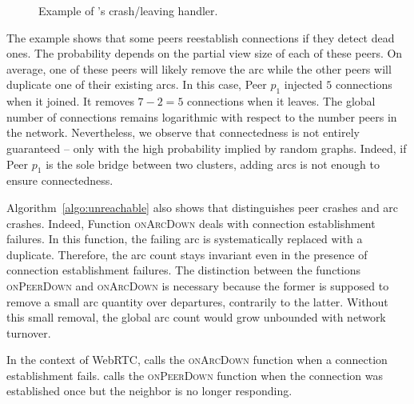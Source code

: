 \begin{figure*}
  \centering
  \hspace{10pt}
  \hspace{10pt}
  \caption{\label{fig:crashexample}Example of \SPRAY's crash/leaving
    handler. }
\end{figure*}

The example shows that some peers reestablish connections if they
detect dead ones. The probability depends on the partial view size of
each of these peers. On average, one of these peers will likely remove
the arc while the other peers will duplicate one of their existing
arcs. In this case, Peer $p_1$ injected $5$ connections when it
joined. It removes $7-2 =5 $ connections when it leaves. The global
number of connections remains logarithmic with respect to the number
peers in the network. Nevertheless, we observe that connectedness is
not entirely guaranteed -- only with the high probability implied by
random graphs. Indeed, if Peer $p_1$ is the sole bridge between two
clusters, adding arcs is not enough to ensure connectedness.

Algorithm~\ref{algo:unreachable} also shows that \SPRAY distinguishes peer
crashes and arc crashes. Indeed, Function \textsc{onArcDown} deals with
connection establishment failures. In this function, the failing arc is
systematically replaced with a duplicate. Therefore, the arc count stays
invariant even in the presence of connection establishment failures. The
distinction between the functions \textsc{onPeerDown} and \textsc{onArcDown} is
necessary because the former is supposed to remove a small arc quantity over
departures, contrarily to the latter. Without this small removal, the global arc
count would grow unbounded with network turnover.

In the context of WebRTC, \SPRAY calls the \textsc{onArcDown} function
when a connection establishment fails. \SPRAY calls the
\textsc{onPeerDown} function when the connection was established once
but the neighbor is no longer responding.

